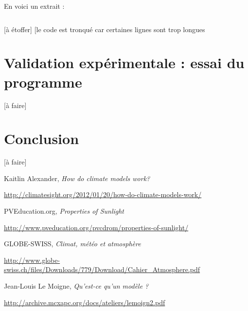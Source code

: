\documentclass[12pt]{article}
\begin{document}
En voici un extrait :

\inputminted[linenos]{rust}{temperature.rs}

[à étoffer]
[le code est tronqué car certaines lignes sont trop longues

\clearpage
\section{Validation expérimentale : essai du programme}

[à faire]

\clearpage
\section{Conclusion}

[à faire]


\begin{thebibliography}{9}

Kaitlin Alexander, \textit{How do climate models work?}

\url{http://climatesight.org/2012/01/20/how-do-climate-models-work/}


PVEducation.org, \textit{Properties of Sunlight}

\url{http://www.pveducation.org/pvcdrom/properties-of-sunlight/}


GLOBE-SWISS, \textit{Climat, météo et atmosphère}

\url{http://www.globe-swiss.ch/files/Downloads/779/Download/Cahier_Atmosphere.pdf}


Jean-Louis Le Moigne, \textit{Qu'est-ce qu'un modèle ?}

\url{http://archive.mcxapc.org/docs/ateliers/lemoign2.pdf}


\end{thebibliography}
\end{document}
